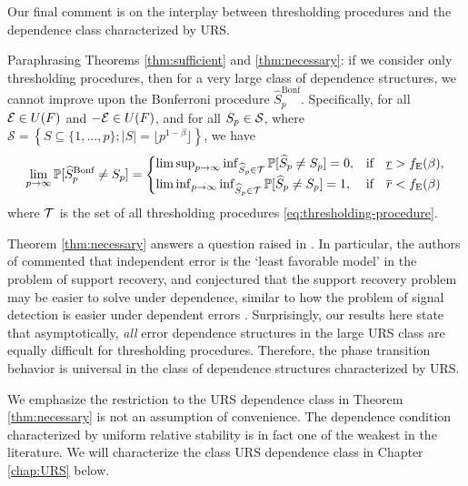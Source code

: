 Our final comment is on the interplay between thresholding procedures and the dependence class characterized by URS.
\begin{remark} \label{rmk:dependence-assumptions}
Paraphrasing Theorems \ref{thm:sufficient} and \ref{thm:necessary}: if we consider only thresholding procedures, then for a very large class of dependence structures, we cannot improve upon the Bonferroni procedure $\widehat{S}_p^{\text{Bonf}}$. 
Specifically, for all ${\cal E}\in U(F)$ and ${-\cal E}\in U(F)$, and for all $S_p\in {\cal S}$, where $\mathcal{S} = \left\{S\subseteq\{1,\ldots,p\};|S|=\lfloor p^{1-\beta}\rfloor\right\}$, we have
\begin{equation}
    \lim_{p\to\infty} \P[\widehat{S}_p^{\text{Bonf}}\neq S_p]
    = \begin{cases}
    \limsup_{p\to\infty} \inf_{\widehat{S}_p \in {\cal T}} \P[\widehat{S}_p\neq S_p] = 0, & \text{if}\quad \underline{r} > f_{\mathrm{E}}(\beta),\\
    \liminf_{p\to\infty} \inf_{\widehat{S}_p \in {\cal T}} \P[\widehat{S}_p\neq S_p] = 1, & \text{if}\quad \overline{r} < f_{\mathrm{E}}(\beta)\\
    \end{cases}
\end{equation}
where $\cal T$ is the set of all thresholding procedures \eqref{eq:thresholding-procedure}. 

Theorem \ref{thm:necessary} answers a question raised in \citet{butucea2018variable}.
In particular, the authors of \citep{butucea2018variable} commented that independent error is the  `least favorable model' in the problem of support recovery, and 
conjectured that the support recovery problem may be easier to solve under dependence, similar to how the problem of signal detection is easier under dependent 
errors \citep{hall2010innovated}. 
Surprisingly, our results here state that asymptotically, \emph{all} error dependence structures in the large URS class are equally difficult for {thresholding procedures}. Therefore, the phase transition behavior is universal in the class of dependence structures characterized by URS.
\end{remark}

We emphasize the restriction to the URS dependence class in Theorem \ref{thm:necessary} is {not} an assumption of convenience. 
The dependence condition characterized by uniform relative stability is in fact one of the weakest in the literature.
We will characterize the class URS dependence class in Chapter \ref{chap:URS} below.

